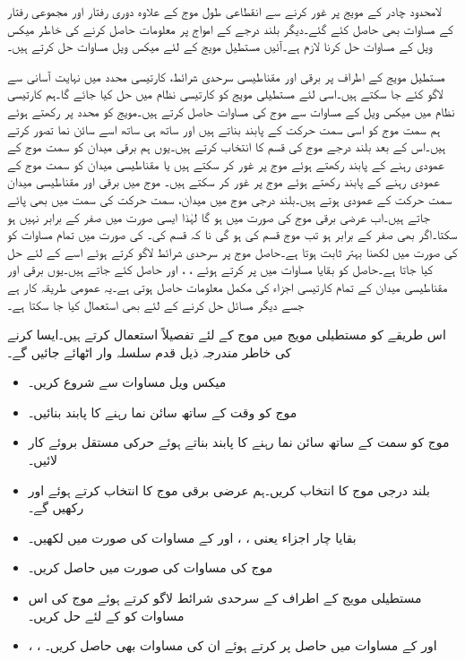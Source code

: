 لامحدود چادر کے مویج پر غور کرنے سے انقطاعی طول موج کے علاوہ دوری رفتار اور مجموعی رفتار کے مساوات بھی حاصل کئے گئے۔دیگر بلند درجے کے امواج پر معلومات حاصل کرنے کی خاطر میکس ویل کے مساوات حل کرنا لازم ہے۔آئیں  مستطیل مویج کے لئے میکس ویل مساوات حل کرتے ہیں۔

مستطیل مویج کے اطراف پر برقی اور مقناطیسی سرحدی شرائط، کارتیسی محدد میں نہایت آسانی سے لاگو کئے جا سکتے ہیں۔اسی لئے مستطیلی مویج کو کارتیسی نظام میں حل کیا جائے گا۔ہم کارتیسی نظام میں میکس ویل کے مساوات سے  موج کی مساوات حاصل کرتے ہیں۔مویج کو  محدد پر رکھتے ہوئے ہم سمت موج کو اسی سمت حرکت کے پابند بناتے ہیں اور ساتھ ہی ساتھ اسے سائن نما تصور کرتے ہیں۔اس کے بعد بلند درجے موج کی قسم کا انتخاب کرتے ہیں۔یوں ہم برقی میدان  کو سمت موج کے عمودی رہنے کے پابند رکھتے ہوئے   موج پر غور کر سکتے ہیں یا مقناطیسی میدان کو سمت موج کے عمودی رہنے کے پابند رکھتے ہوئے   موج پر غور کر سکتے ہیں۔ موج میں برقی اور مقناطیسی میدان سمت حرکت کے عمودی ہوتے ہیں۔بلند درجی موج میں میدان، سمت حرکت کی سمت میں بھی پائے جاتے ہیں۔اب عرضی برقی  موج کی صورت میں  ہو گا لہٰذا ایسی صورت میں  صفر کے برابر نہیں ہو سکتا۔اگر  بھی صفر کے برابر ہو تب موج  قسم کی ہو گی نا کہ  قسم کی۔ کی صورت میں تمام مساوات کو  کی صورت میں لکھنا بہتر ثابت ہوتا ہے۔حاصل موج پر سرحدی شرائط لاگو کرتے ہوئے اسے  کے لئے حل کیا جاتا ہے۔حاصل  کو بقایا مساوات میں پر کرتے ہوئے ، ،  اور  حاصل کئے جاتے ہیں۔یوں برقی اور مقناطیسی میدان کے تمام کارتیسی اجزاء کی مکمل معلومات حاصل ہوتی ہے۔یہ عمومی طریقہ کار ہے جسے دیگر مسائل حل کرنے کے لئے بھی استعمال کیا جا سکتا ہے۔

اس طریقے کو مستطیلی مویج میں  موج کے لئے تفصیلاً  استعمال کرتے ہیں۔ایسا کرنے کی خاطر مندرجہ ذیل قدم سلسلہ وار اٹھائے جائیں گے۔
\begin{itemize}\label{اقدام_مویج_آٹھ_قدم}
\item
میکس ویل مساوات سے شروع کریں۔
\item
موج کو وقت کے ساتھ سائن نما رہنے کا پابند بنائیں۔
\item
موج کو  سمت کے ساتھ سائن نما رہنے کا پابند بناتے ہوئے  حرکی مستقل بروئے کار لائیں۔
\item
بلند درجی موج کا انتخاب کریں۔ہم  عرضی برقی  موج کا انتخاب کرتے ہوئے  اور  رکھیں گے۔
\item
بقایا چار اجزاء یعنی ، ،  اور  کے مساوات  کی صورت میں لکھیں۔
\item
موج کی مساوات  کی صورت میں حاصل کریں۔
\item
مستطیلی مویج کے اطراف کے سرحدی شرائط لاگو کرتے ہوئے موج کی اس مساوات کو  کے لئے حل کریں۔
\item
{}، ،  اور  کے مساوات میں حاصل  پر کرتے ہوئے ان کی مساوات بھی حاصل کریں۔
\end{itemize}  


